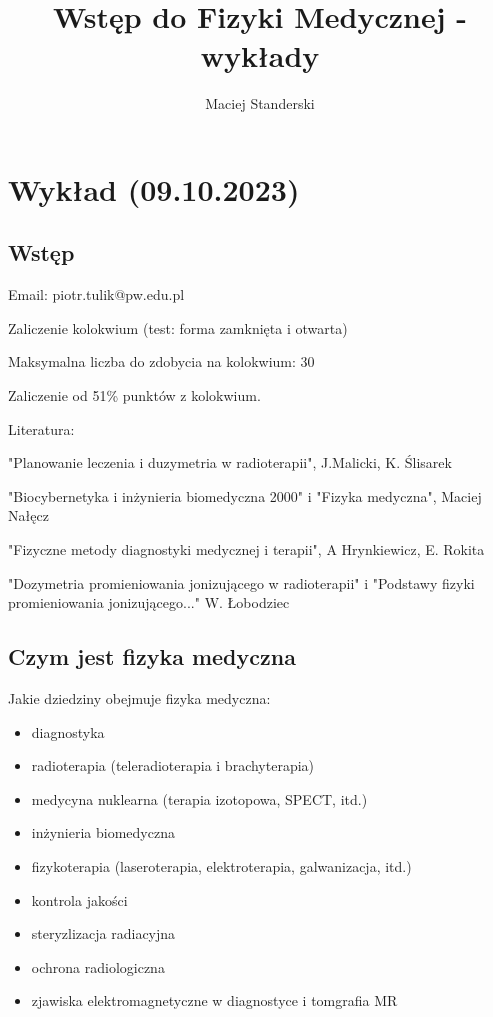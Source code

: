 \documentclass{article}
\title{Wstęp do Fizyki Medycznej - wykłady}
\author{Maciej Standerski}
\begin{document}
\maketitle

\section{Wykład (09.10.2023)}

\subsection{Wstęp}

Email: piotr.tulik@pw.edu.pl

Zaliczenie kolokwium (test: forma zamknięta i otwarta)

Maksymalna liczba do zdobycia na kolokwium: 30

Zaliczenie od 51\% punktów z kolokwium.

Literatura:

"Planowanie leczenia i duzymetria w radioterapii", J.Malicki, K. Ślisarek

"Biocybernetyka i inżynieria biomedyczna 2000" i "Fizyka medyczna", Maciej Nałęcz

"Fizyczne metody diagnostyki medycznej i terapii", A Hrynkiewicz, E. Rokita

"Dozymetria promieniowania jonizującego w radioterapii" i "Podstawy fizyki promieniowania jonizującego..." W. Łobodziec

\subsection{Czym jest fizyka medyczna}

Jakie dziedziny obejmuje fizyka medyczna:
\begin{itemize}
    \item diagnostyka
    \item radioterapia (teleradioterapia i brachyterapia)
    \item medycyna nuklearna (terapia izotopowa, SPECT, itd.)
    \item inżynieria biomedyczna
    \item fizykoterapia (laseroterapia, elektroterapia, galwanizacja, itd.)
    \item kontrola jakości
    \item steryzlizacja radiacyjna
    \item ochrona radiologiczna
    \item zjawiska elektromagnetyczne w diagnostyce i tomgrafia MR
\end{itemize}
\end{document}
